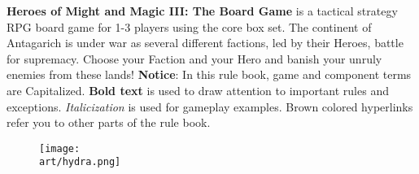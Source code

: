 
\bigbreak

\textbf{Heroes of Might and Magic III: The Board Game} is a tactical strategy RPG board game for 1-3 players using the core box set.
The continent of Antagarich is under war as several different factions, led by their Heroes, battle for supremacy. Choose your Faction and your Hero and banish your unruly enemies from these lands!
\bigbreak
\textbf{Notice}: In this rule book, game and component terms are Capitalized.
\textbf{Bold text} is used to draw attention to important rules and exceptions.
\textit{Italicization} is used for gameplay examples.
\textcolor{goldenbrown}{Brown colored hyperlinks} refer you to other parts of the rule book.
\vfill
\begin{figure}[hb]
  \centering
  \texttt{[image: \\art/hydra.png]}
\end{figure}
\vfill
